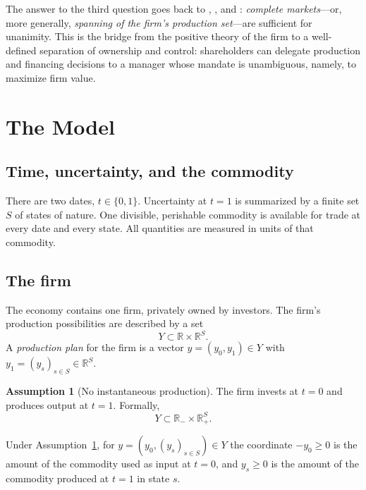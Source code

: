 \documentclass[11pt,a4paper,oneside]{book}
\def\R{\mathbb{R}}
\def\geq{\geqslant}
\theoremstyle{plain}
\theoremstyle{definition}
\newtheorem{assumption}[theorem]{Assumption}
\theoremstyle{remark}
\numberwithin{equation}{chapter}
\begin{document}
The answer to the third question goes back to \citet{Fisher1930}, \citet{Dreze1974}, and \citet{GrossmanHart1979}: \emph{complete markets}---or, more generally, \emph{spanning of the firm's production set}---are sufficient for unanimity.
This is the bridge from the positive theory of the firm to a well-defined separation of ownership and control: shareholders can delegate production and financing decisions to a manager whose mandate is unambiguous, namely, to maximize firm value.

\section{The Model}
\label{sec:model}

\subsection{Time, uncertainty, and the commodity}

There are two dates, $t \in \{0,1\}$.
Uncertainty at $t=1$ is summarized by a finite set $S$ of states of nature.
One divisible, perishable commodity is available for trade at every date and every state.
All quantities are measured in units of that commodity.

\subsection{The firm}

The economy contains one firm, privately owned by investors.
The firm's production possibilities are described by a set
\begin{equation*}
  Y \subset \R \times \R^{S}.
\end{equation*}
A \emph{production plan} for the firm is a vector $y = (y_0, y_1) \in Y$ with $y_1 = (y_s)_{s \in S} \in \R^S$.

\begin{assumption}[No instantaneous production]\label{ass:no-instant}
The firm invests at $t=0$ and produces output at $t=1$.
Formally,
\begin{equation*}
  Y \subset \R_{-} \times \R^{S}_{+}.
\end{equation*}
\end{assumption}

Under Assumption~\ref{ass:no-instant}, for $y = (y_0, (y_s)_{s \in S}) \in Y$ the coordinate $-y_0 \geq 0$ is the amount of the commodity used as input at $t=0$, and $y_s \geq 0$ is the amount of the commodity produced at $t=1$ in state $s$.
\end{document}
